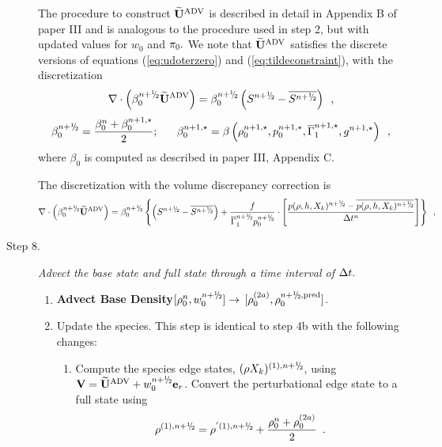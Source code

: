 \begin{description}
The procedure to construct $\widetilde{\mathbf{U}}^{\mathrm{ADV}}$ is described in detail in Appendix B of paper III
and is analogous to the procedure used in step 2, but with updated values
for $w_0$ and $\pi_0.$  We note that $\widetilde{\mathbf{U}}^{\mathrm{ADV}}$ satisfies the discrete versions of 
equations (\ref{eq:udoterzero}) and (\ref{eq:tildeconstraint}), with the discretization
\begin{equation}
\nabla \cdot \left(\beta_0^{\nph} \uadvtwo\right) =
\beta_0^{\nph}\left(S^{\nph} - \overline{S^{\nph}}\right) \enskip ,
\end{equation}
\begin{equation}
\beta_0^{\nph} = \frac{ \beta_0^n +  \beta_0^{n+1,\star} }{2}; ~~~~~
 \beta_0^{n+1,\star} = \beta \left(\rho_0^{n+1,\star}, p_0^{n+1,\star}, \gammabar^{n+1,\star}, g^{n+1,\star}\right) \enskip ,
\end{equation}
where $\beta_0$ is computed as described in paper III, Appendix C.

The discretization with the volume discrepancy correction is
\begin{equation}
\nabla \cdot \left(\beta_0^{\nph} \uadvtwo\right) =
\beta_0^{\nph}\left\{\left(S^{\nph} - \overline{S^{\nph}}\right)
 + \frac{f}{\gammabar^{\nph} p_0^{\nph}}\cdot 
\left[\frac{p(\rho,h,X_k)^{\nph} - \overline{p(\rho,h,X_k)^{\nph}}}{\Delta t^n}\right]\right\} \enskip ,
\end{equation}

\item[Step 8.] {\em Advect the base state and full state through a time interval of $\Delta t.$}

\begin{enumerate}
\renewcommand{\theenumi}{{\bf \alph{enumi}}}

\item {\bf Advect Base Density}$[\rho_0^{n},w_0^{\nph}] \rightarrow$ 
$[\rho_0^{(2a)}, \rho_0^{\nph,{\rm pred}}]$.

\item Update the species.  This step is identical to step 4b with the following changes:

\begin{enumerate}
\renewcommand{\labelenumii}{{\bf \roman{enumii}}.}

\item Compute the species edge states, $(\rho X_k)^{(1),n+\myhalf}$, 
using $\Vb = \uadvtwo+w_0^{\nph}\eb_r$.  Convert the perturbational edge 
state to a full state using 
\begin{equation}
\rho^{(1),\nph} = \rho^{'(1),\nph} + \frac{\rho_0^n + \rho_0^{(2a)}}{2}\enskip .
\end{equation}


\end{enumerate}
\end{enumerate}
\end{description}
